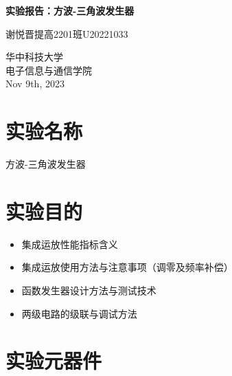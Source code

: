 \documentclass[a4paper,11pt,UTF8]{article}
\numberwithin{equation}{subsection}
\begin{document}
	\begin{titlepage}
		\begin{center}
			\vspace*{1cm}
			\textbf{\LARGE 实验报告：方波-三角波发生器}
			\vspace{0.5cm}
			
			\Large 谢悦晋\quad 提高2201班\quad U20221033
			\vspace{1cm}
			\begin{figure}[H]
				\centering
				\caption*{}
			\end{figure}
			\vfill
			\vspace{0.8cm}
			华中科技大学 \\
			电子信息与通信学院 \\
			Nov 9th, 2023
		\end{center}
	\end{titlepage}
\tableofcontents\newpage
\section{实验名称}
方波-三角波发生器
\section{实验目的}
\begin{itemize}
	\item 集成运放性能指标含义
	\item 集成运放使用方法与注意事项（调零及频率补偿）
	\item 函数发生器设计方法与测试技术
	\item 两级电路的级联与调试方法	
\end{itemize}
\section{实验元器件}
\end{document}
